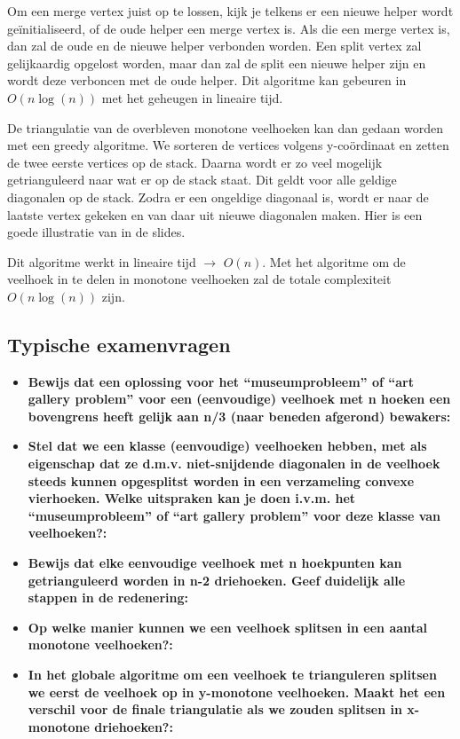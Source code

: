 \documentclass[12pt,a4paper]{article}
\begin{document}
	Om een merge vertex juist op te lossen, kijk je telkens er een nieuwe helper wordt geïnitialiseerd, of de oude helper een merge vertex is. Als die een merge vertex is, dan zal de oude en de nieuwe helper verbonden worden. Een split vertex zal gelijkaardig opgelost worden, maar dan zal de split een nieuwe helper zijn en wordt deze verboncen met de oude helper. Dit algoritme kan gebeuren in $O(n\log(n))$ met het geheugen in lineaire tijd. 
	
	De triangulatie van de overbleven monotone veelhoeken kan dan gedaan worden met een greedy algoritme. We sorteren de vertices volgens y-coördinaat en zetten de twee eerste vertices op de stack. Daarna wordt er zo veel mogelijk getrianguleerd naar wat er op de stack staat. Dit geldt voor alle geldige diagonalen op de stack. Zodra er een ongeldige diagonaal is, wordt er naar de laatste vertex gekeken en van daar uit nieuwe diagonalen maken. Hier is een goede illustratie van in de slides. 
	
	Dit algoritme werkt in lineaire tijd $\rightarrow$ $O(n)$. Met het algoritme om de veelhoek in te delen in monotone veelhoeken zal de totale complexiteit $O(n\log(n))$ zijn. 
	
	
	\subsection{Typische examenvragen}
	\begin{itemize}
		\item \textbf{Bewijs dat een oplossing voor het “museumprobleem” of “art gallery problem” voor een (eenvoudige) veelhoek met n hoeken een bovengrens heeft gelijk aan  n/3 (naar beneden afgerond) bewakers:}\\
		\item \textbf{Stel dat we een klasse (eenvoudige) veelhoeken hebben, met als eigenschap dat ze d.m.v. niet-snijdende diagonalen in de veelhoek steeds kunnen opgesplitst worden in een verzameling convexe vierhoeken. Welke uitspraken kan je doen i.v.m. het “museumprobleem” of “art gallery problem” voor deze klasse van veelhoeken?:}\\
		\item \textbf{Bewijs dat elke eenvoudige veelhoek met n hoekpunten kan getrianguleerd worden in n-2 driehoeken. Geef duidelijk alle stappen in de redenering:}\\
		\item \textbf{Op welke manier kunnen we een veelhoek splitsen in een aantal monotone veelhoeken?:}\\
		\item \textbf{In het globale algoritme om een veelhoek te trianguleren splitsen we eerst de veelhoek op in y-monotone veelhoeken. Maakt het een verschil voor de finale triangulatie als we zouden splitsen in x-monotone driehoeken?:}\\
	\end{itemize}
	
\end{document}
